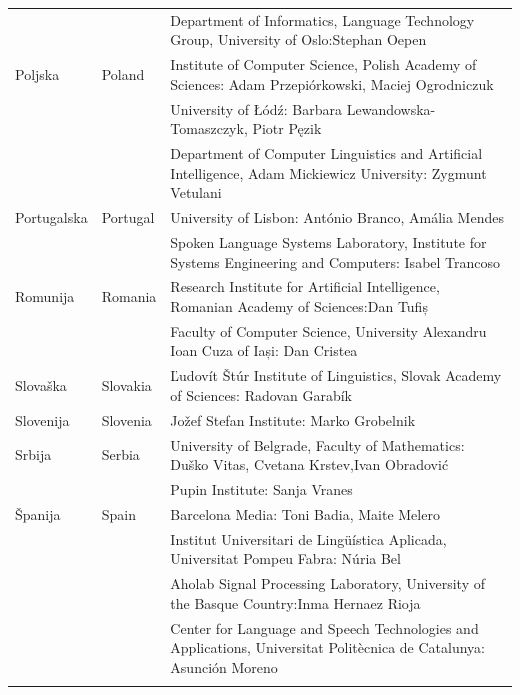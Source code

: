 \begin{longtable}{@{}llp{113mm}@{}}
  & & Department of Informatics, Language Technology Group, University of Oslo:\newline Stephan Oepen \\ \addlinespace
  Poljska & \textcolor{grey1}{Poland} & Institute of Computer Science, Polish Academy of Sciences: Adam Przepiórkowski, Maciej Ogrodniczuk \\ \addlinespace
  & & University of Łódź: Barbara Lewandowska-Tomaszczyk, Piotr Pęzik\\ \addlinespace
  & & Department of Computer Linguistics and Artificial Intelligence, Adam Mickiewicz University: Zygmunt Vetulani \\ \addlinespace
  Portugalska & \textcolor{grey1}{Portugal} & University of Lisbon: António Branco, Amália Mendes\\ \addlinespace %
  & & Spoken Language Systems Laboratory, Institute for Systems Engineering and Computers: Isabel Trancoso \\ \addlinespace
  Romunija & \textcolor{grey1}{Romania} & Research Institute for Artificial Intelligence, Romanian Academy of Sciences:\newline Dan Tufiș \\ \addlinespace
  & & Faculty of Computer Science, University Alexandru Ioan Cuza of Iași: Dan Cristea \\ \addlinespace
  Slovaška & \textcolor{grey1}{Slovakia} & Ľudovít Štúr Institute of Linguistics, Slovak Academy of Sciences: Radovan Garabík  \\ \addlinespace 
  Slovenija & \textcolor{grey1}{Slovenia} & Jožef Stefan Institute: Marko Grobelnik \\ \addlinespace 
  Srbija & \textcolor{grey1}{Serbia} & University of Belgrade, Faculty of Mathematics: Duško Vitas, Cvetana Krstev,\newline Ivan Obradović \\ \addlinespace
  & & Pupin Institute: Sanja Vranes \\ \addlinespace  
  Španija & \textcolor{grey1}{Spain} & Barcelona Media: Toni Badia, Maite Melero \\ \addlinespace 
  & & Institut Universitari de Lingüística Aplicada, Universitat Pompeu Fabra: Núria Bel \\ \addlinespace 
  & & Aholab Signal Processing Laboratory, University of the Basque Country:\newline Inma Hernaez Rioja \\ \addlinespace 
  & & Center for Language and Speech Technologies and Applications, Universitat Politècnica de Catalunya:  Asunción Moreno \\ \addlinespace 

\end{longtable}

